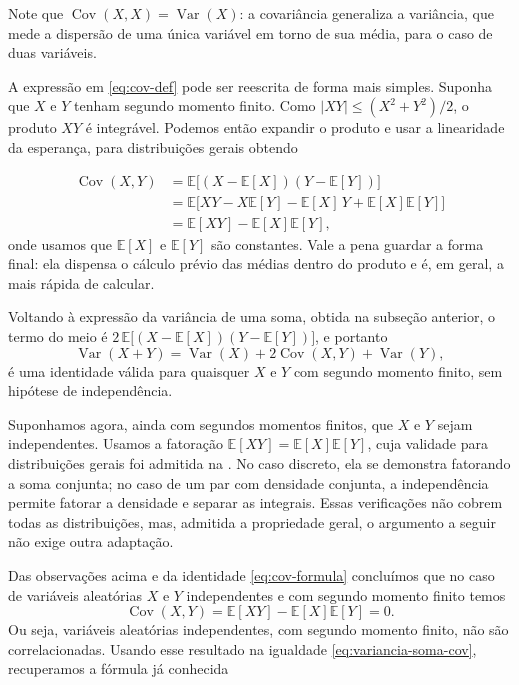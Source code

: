 \documentclass[12pt,portuguese]{article}
\theoremstyle{definition}
\theoremstyle{plainexercise}
\theoremstyle{starredexercise}
\theoremstyle{definition}
\begin{document}
Note que $\operatorname{Cov}(X,X)=\operatorname{Var}(X)$: a covariância
generaliza a variância, que mede a dispersão de uma única variável em torno de
sua média, para o caso de duas variáveis.

A expressão em \eqref{eq:cov-def} pode ser reescrita de forma mais simples.
Suponha que $X$ e $Y$ tenham segundo momento finito. Como
$|XY|\leqslant(X^2+Y^2)/2$, o produto $XY$ é integrável. Podemos então
expandir o produto e usar a linearidade da esperança, para distribuições
gerais obtendo

\begin{equation}\label{eq:cov-formula}
\begin{aligned}
\operatorname{Cov}(X,Y)
&= \mathbb{E}\bigl[(X-\mathbb{E}[X])(Y-\mathbb{E}[Y])\bigr] \\[0.3cm]
&= \mathbb{E}\bigl[XY - X\mathbb{E}[Y] - \mathbb{E}[X]\,Y
   + \mathbb{E}[X]\mathbb{E}[Y]\bigr] \\[0.3cm]
&= \mathbb{E}[XY] - \mathbb{E}[X]\mathbb{E}[Y],
\end{aligned}
\end{equation}
onde usamos que $\mathbb{E}[X]$ e $\mathbb{E}[Y]$ são constantes. Vale a pena
guardar a forma final: ela dispensa o cálculo prévio das médias dentro do
produto e é, em geral, a mais rápida de calcular.

Voltando à expressão da variância de uma soma, obtida na subseção anterior, o
termo do meio é $2\,\mathbb{E}\bigl[(X-\mathbb{E}[X])(Y-\mathbb{E}[Y])\bigr]$,
e portanto
\begin{equation}\label{eq:variancia-soma-cov}
\operatorname{Var}(X+Y)
= \operatorname{Var}(X) + 2\operatorname{Cov}(X,Y) + \operatorname{Var}(Y),
\end{equation}
é uma identidade válida para quaisquer $X$ e $Y$ com segundo momento finito, sem
hipótese de independência.

Suponhamos agora, ainda com segundos momentos finitos, que $X$ e $Y$ sejam
independentes. Usamos a fatoração
$\mathbb{E}[XY]=\mathbb{E}[X]\mathbb{E}[Y]$, cuja validade para
distribuições gerais foi admitida na . No caso
discreto, ela se demonstra fatorando a soma conjunta; no caso de um par com
densidade conjunta, a independência permite fatorar a densidade e separar
as integrais. Essas verificações não cobrem todas as distribuições, mas,
admitida a propriedade geral, o argumento a seguir não exige outra
adaptação. 

Das observações acima e da identidade \eqref{eq:cov-formula} concluímos que
no caso de variáveis aleatórias $X$ e $Y$ independentes e com segundo momento
finito temos 
\begin{equation}\label{eq:cov-independentes}
\operatorname{Cov}(X,Y)=\mathbb{E}[XY]-\mathbb{E}[X]\mathbb{E}[Y]=0.
\end{equation}
Ou seja, variáveis aleatórias independentes, com segundo momento finito, 
não são correlacionadas. Usando esse
resultado na igualdade \eqref{eq:variancia-soma-cov}, recuperamos a fórmula já conhecida
\end{document}
